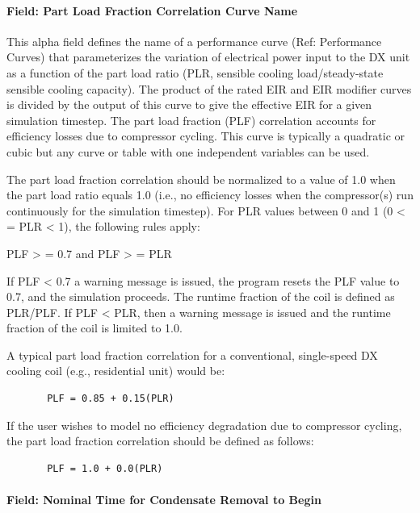 \paragraph{Field: Part Load Fraction Correlation Curve Name}\label{field-part-load-fraction-correlation-curve-name-2}

This alpha field defines the name of a performance curve (Ref: Performance Curves) that parameterizes the variation of electrical power input to the DX unit as a function of the part load ratio (PLR, sensible cooling load/steady-state sensible cooling capacity). The product of the rated EIR and EIR modifier curves is divided by the output of this curve to give the effective EIR for a given simulation timestep. The part load fraction (PLF) correlation accounts for efficiency losses due to compressor cycling. This curve is typically a quadratic or cubic but any curve or table with one independent variables can be used.

The part load fraction correlation should be normalized to a value of 1.0 when the part load ratio equals 1.0 (i.e., no efficiency losses when the compressor(s) run continuously for the simulation timestep). For PLR values between 0 and 1 (0 \textless{} = PLR \textless{} 1), the following rules apply:

PLF \textgreater{} = 0.7 and PLF \textgreater{} = PLR

If PLF \textless{} 0.7 a warning message is issued, the program resets the PLF value to 0.7, and the simulation proceeds. The runtime fraction of the coil is defined as PLR/PLF. If PLF \textless{} PLR, then a warning message is issued and the runtime fraction of the coil is limited to 1.0.

A typical part load fraction correlation for a conventional, single-speed DX cooling coil (e.g., residential unit) would be:

\begin{lstlisting}
       PLF = 0.85 + 0.15(PLR)
\end{lstlisting}

If the user wishes to model no efficiency degradation due to compressor cycling, the part load fraction correlation should be defined as follows:

\begin{lstlisting}
       PLF = 1.0 + 0.0(PLR)
\end{lstlisting}

\paragraph{Field: Nominal Time for Condensate Removal to Begin}\label{field-nominal-time-for-condensate-removal-to-begin}

